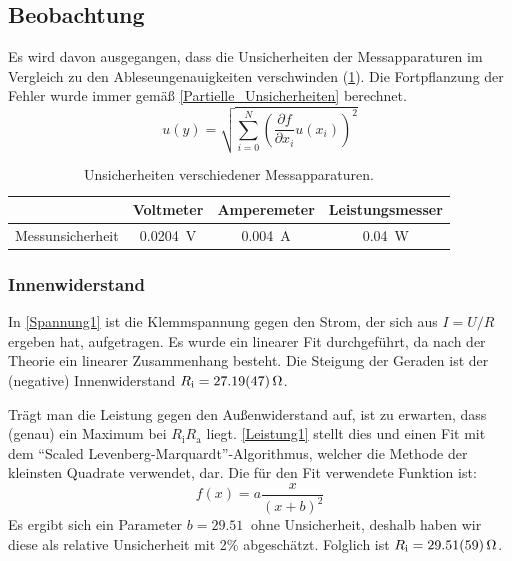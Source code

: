 \documentclass[
	a4paper,
	12pt,
	pagesize,
	ngerman
]{scrartcl}
\begin{document}
	\subsection{Beobachtung}
	Es wird davon ausgegangen, dass die Unsicherheiten der Messapparaturen im Vergleich zu den Ableseungenauigkeiten verschwinden (\cref{Tabelle_Unsicherheiten}).
	Die Fortpflanzung der Fehler wurde immer gemäß \cref{Partielle_Unsicherheiten} berechnet.
	\begin{equation}
		u(y) = \sqrt{  \sum_{i=0}^{N} \left( \frac{\partial f}{\partial x_i}u(x_i)\right)^2  }
		\label{Partielle_Unsicherheiten}
	\end{equation}
	\begin{table}[tb]
		\centering
		\begin{tabular}{ r | c | c | c}
			& Voltmeter & Amperemeter & Leistungsmesser \\ \hline %
			 Messunsicherheit& \SI{0,0204}{V}&  \SI{0,004}{A}&  \SI{0,04}{W}\\

		\end{tabular}
		\caption{Unsicherheiten verschiedener Messapparaturen.} %
		\label{Tabelle_Unsicherheiten} 
	\end{table}
	
	\subsubsection{Innenwiderstand}
	In \cref{Spannung1} ist die Klemmspannung gegen den Strom, der sich aus $I = U/R$ ergeben hat, aufgetragen. 
	Es wurde ein linearer Fit durchgeführt, da nach der Theorie ein linearer Zusammenhang besteht. 
	Die Steigung der Geraden ist der (negative) Innenwiderstand $R_\text{i} = \SI{27,19 \pm 0,47}{\Omega}$.

	Trägt man die Leistung gegen den Außenwiderstand auf, ist zu erwarten, dass (genau) ein Maximum bei $R_\text{i}  R_\text{a}$ liegt. %
	\cref{Leistung1} stellt dies und einen Fit mit dem \enquote{Scaled Levenberg-Marquardt}-Algorithmus, welcher die Methode der kleinsten Quadrate verwendet, dar. 
	Die für den Fit verwendete Funktion ist:
	\begin{equation}
		f(x)=a\frac{x}{(x+b)^2}
	\end{equation}
	Es ergibt sich ein Parameter $b = \SI{29,51}{}$ ohne Unsicherheit, deshalb haben wir diese als relative Unsicherheit mit 2\% abgeschätzt. %
	Folglich ist $R_\text{i} = \SI{29,51 \pm 0,59}{\Omega}$.
\end{document}
